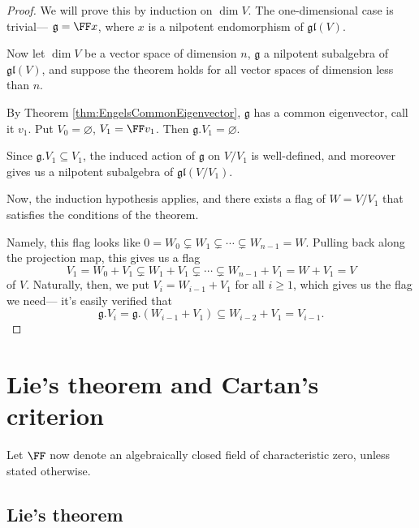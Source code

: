 \documentclass{article}
\newcommand*\frkg{{\ensuremath{\mathfrak{g}}}}
\newcommand*\gl{\ensuremath{\mathfrak{gl}}}
\newcommand*\acts{.}
\begin{document}
\begin{proof}
    We will prove this by induction on $\dim V$.
    The one-dimensional case is trivial--- $\frkg = \FF x$, where $x$ is a nilpotent endomorphism of $\gl(V)$.

    Now let $\dim V$ be a vector space of dimension $n$, $\frkg$ a nilpotent subalgebra of $\gl(V)$, and suppose the theorem holds for all vector spaces of dimension less than $n$.

    By Theorem \ref{thm:EngelsCommonEigenvector}, $\frkg$ has a common eigenvector, call it $v_1$.
    Put $V_0 = \varnothing$, $V_1 = \FF v_1$.
    Then $\frkg \acts V_1 = \varnothing$.

    Since $\frkg \acts V_1 \subseteq V_1$, the induced action of $\frkg$ on $V/V_1$ is well-defined, and moreover gives us a nilpotent subalgebra of $\gl(V/V_1)$.

    Now, the induction hypothesis applies, and there exists a flag of $W = V/V_1$ that satisfies the conditions of the theorem.

    Namely, this flag looks like $0 = W_0 \subsetneq W_1 \subsetneq \cdots \subsetneq W_{n-1} = W$.
    Pulling back along the projection map, this gives us a flag
    \[
        V_1 = W_0 + V_1 \subsetneq W_1 + V_1 \subsetneq \cdots \subsetneq W_{n-1} + V_1 = W + V_1 = V
    \]
    of $V$.
    Naturally, then, we put $V_i = W_{i-1} + V_1$ for all $i \geq 1$, which gives us the flag we need--- it's easily verified that
    \[
        \frkg \acts V_i
        =
        \frkg \acts (W_{i-1} + V_1) 
        \subseteq
        W_{i-2} + V_1
        =
        V_{i-1}.
    \]

\end{proof}

\section{
Lie's theorem and Cartan's criterion 
\texorpdfstring{\cite[\S 4]{Hum72}}{[Hum.\S 4]}
}

\begin{convention}
    Let $\FF$ now denote an algebraically closed field of characteristic zero, unless stated otherwise.
\end{convention}

\subsection{Lie's theorem}
\end{document}
